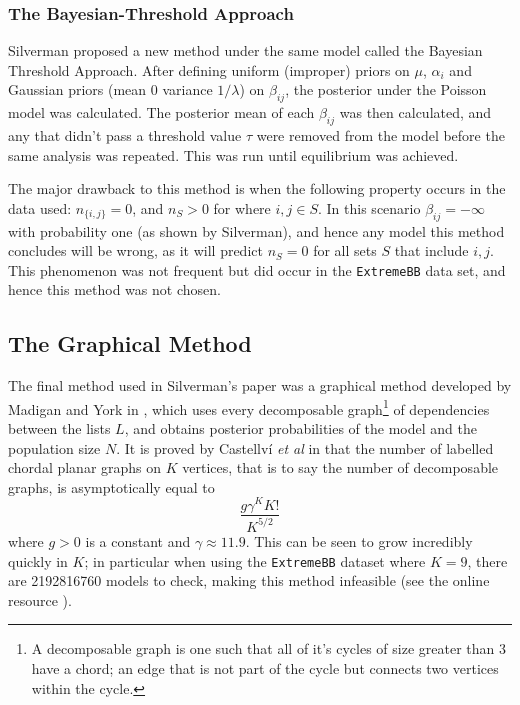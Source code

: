 \documentclass[10pt,a4paper,notitlepage]{article}
\begin{document}
\subsubsection*{The Bayesian-Threshold Approach}
Silverman proposed a new method under the same model called the Bayesian Threshold Approach. After defining uniform (improper) priors on $\mu$, $\alpha_{i}$ and Gaussian priors (mean 0 variance $1/\lambda$) on $\beta_{ij}$, the posterior under the Poisson model was calculated. The posterior mean of each $\beta_{ij}$ was then calculated,  and any that didn't pass a threshold value $\tau$ were removed from the model before the same analysis was repeated. This was run until equilibrium was achieved.

The major drawback to this method is when the following property occurs in the data used: $n_{\{i,j\}}=0$, and $n_{S}>0$ for where $i,j\in S$. In this scenario $\beta_{ij}=-\infty$ with probability one (as shown by Silverman), and hence any model this method concludes will be wrong, as it will predict $n_{S}=0$ for all sets $S$ that include $i,j$. This phenomenon was not frequent but did occur in the \texttt{ExtremeBB} data set, and hence this method was not chosen.

\subsection{The Graphical Method}
The final method used in Silverman's paper was a graphical method developed by Madigan and York in \cite{Madigan}, which uses every decomposable graph\footnote{A decomposable graph is one such that all of it's cycles of size greater than 3 have a chord; an edge that is not part of the cycle but connects two vertices within the cycle. } of dependencies between the lists $L$, and obtains posterior probabilities of the model and the population size $N$. It is proved by Castellví \textit{et al} in \cite{Chordal} that the number of labelled chordal planar graphs on $K$ vertices, that is to say the number of decomposable graphs, is asymptotically equal to  
\begin{equation}
\frac{g\gamma^{K}K!}{K^{5/2}}
\end{equation}
where $g>0$ is a constant and $\gamma \approx 11.9$. This can be seen to grow incredibly quickly in $K$; in particular when using the \texttt{ExtremeBB} dataset where $K=9$, there are 2192816760 models to check, making this method infeasible (see the online resource \cite{Graph}). 
\end{document}
